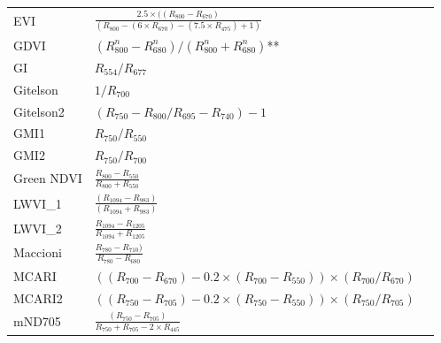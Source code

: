 \documentclass[remotesensing,article,submit,moreauthors,pdftex]{Definitions/mdpi}
\begin{document}
{\begin{supertabular}{lll}
		EVI             & $\frac{2.5\times ((R_{800}-R_{670}) }{ (R_{800}-(6\times R_{670})-(7.5\times R_{475})+1)}$           & \cite{huete1997a}             \\
		GDVI            & $(R_{800}^n-R_{680}^n) / (R_{800}^n+R_{680}^n)$**                                                    & \cite{wu2014}                 \\
		GI              & $R_{554}/R_{677}$                                                                                    & \cite{smith1995}              \\
		Gitelson        & $1/R_{700}$                                                                                          & \cite{gitelson1999}           \\
		Gitelson2       & $(R_{750}-R_{800}/R_{695}-R_{740})-1$                                                                & \cite{gitelson2003}           \\
		GMI1            & $R_{750}/R_{550}$                                                                                    & \cite{gitelson2003}           \\
		GMI2            & $R_{750}/R_{700}$                                                                                    & \cite{gitelson2003}           \\
		Green NDVI      & $\frac{R_{800}-R_{550}}{R_{800}+R_{550}}$                                                            & \cite{gitelson1996}           \\
		LWVI\_1         & $\frac{(R_{1094}-R_{983})}{(R_{1094}+R_{983})}$                                                      & \cite{galvao2005}             \\
		LWVI\_2         & $\frac{R_{1094}-R_{1205}}{R_{1094}+R_{1205}}$                                                        & \cite{galvao2005}             \\
		Maccioni        & $\frac{R_{780}-R_{710})}{R_{780}-R_{680}}$                                                           & \cite{maccioni2001}           \\
		\midrule
		MCARI           & \parbox{5.5cm}{$((R_{700}-R_{670})-0.2\times (R_{700}-R_{550})) \times (R_{700}/R_{670})$}           & \cite{daughtry2000}           \\
		\midrule
		MCARI2          & \parbox{5.5cm}{$((R_{750}-R_{705})-0.2 \times (R_{750}-R_{550})) \times (R_{750}/R_{705})$}          & \cite{wu2008a}                \\
		\midrule
		mND705          & $\frac{(R_{750}-R_{705})}{R_{750}+R_{705}-2\times R_{445}}$                                          & \cite{sims2002a}              \\

\end{supertabular}}
\end{document}

